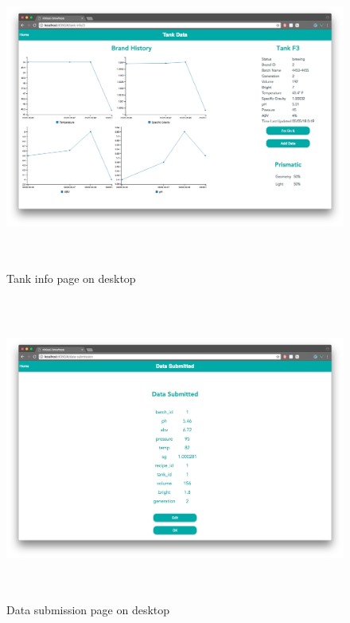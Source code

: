\documentclass[draftclsnofoot,onecolumn,letterpaper,10pt,compsoc]{IEEEtran}
\begin{document}
\begin{figure}
  \centering
  \centerline{\includegraphics[height=10cm]{screenshots/desktop/tank_info.png}}
  \caption{Tank info page on desktop}
\end{figure}
\begin{figure}
  \centering
  \centerline{\includegraphics[height=10cm]{screenshots/desktop/data_submission.png}}
  \caption{Data submission page on desktop}
\end{figure}
\end{document}
